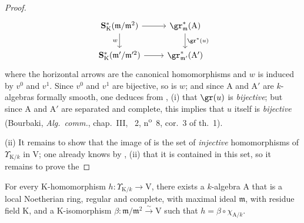 \begin{proof}
\[\begin{tikzcd}
    \mathbf{S}^*_\mathrm{K}(\mathfrak{m}/\mathfrak{m}^2) \ar[r] \ar[d,"w"'] & \gr^*_\mathfrak{m}(\mathrm{A}) \ar[d,"\gr^*(u)"]\\
    \mathbf{S}^*_\mathrm{K}(\mathfrak{m}'/\mathfrak{m}'^2) \ar[r] & \gr^*_{\mathfrak{m}'}(\mathrm{A}')
  \end{tikzcd}
\]
where the horizontal arrows are the canonical homomorphisms and $w$ is induced by $v^0$ and $v^1$. Since $v^0$ and $v^1$ are bijective, so is $w$; and since $\mathrm{A}$ and $\mathrm{A}'$ are $k$-algebras formally smooth, one deduces from , (i) that $\gr(u)$ is \emph{bijective}; but since $\mathrm{A}$ and $\mathrm{A}'$ are separated and complete, this implies that $u$ itself is \emph{bijective} (Bourbaki, \emph{Alg.~comm.}, chap.~III, \textsection~2, n\textsuperscript{o}~8, cor.~3 of th.~1).

(ii) It remains to show that the image of  is the set of \emph{injective} homomorphisms of $\Upsilon_{\mathrm{K}/k}$ in $\mathrm{V}$; one already knows by , (ii) that it is contained in this set, so it remains to prove the
\end{proof}

\begin{lemma}[22.2.5.2]
\label{0.22.2.5.2}
For every $\mathrm{K}$-homomorphism $h:\Upsilon_{\mathrm{K}/k}\to\mathrm{V}$, there exists a $k$-algebra $\mathrm{A}$ that is a local Noetherian ring, regular and complete, with maximal ideal $\mathfrak{m}$, with residue field $\mathrm{K}$, and a $\mathrm{K}$-isomorphism $\beta:\mathfrak{m}/\mathfrak{m}^2\xrightarrow{\sim}\mathrm{V}$ such that $h=\beta\circ\chi_{\mathrm{A}/k}$.
\end{lemma}


